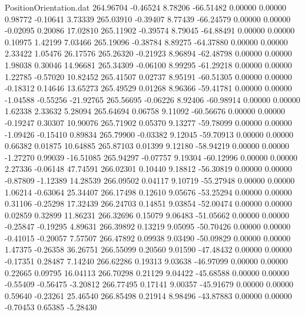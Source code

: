 \begin{filecontents}{PositionOrientation.dat}
 264.96704   -0.46524    8.78206   -66.51482    0.00000    0.00000    0.98772   -0.10641    3.73339
 265.03910   -0.39407    8.77439   -66.24579    0.00000    0.00000   -0.02095    0.20086   17.02810
 265.11902   -0.39574    8.79045   -64.88491    0.00000    0.00000    0.10975    1.42199    7.03466
 265.19096   -0.38784    8.89275   -64.37880    0.00000    0.00000    2.33422    1.05476   26.17576
 265.26320   -0.21923    8.96894   -62.48798    0.00000    0.00000    1.98038    0.30046   14.96681
 265.34309   -0.06100    8.99295   -61.29218    0.00000    0.00000    1.22785   -0.57020   10.82452
 265.41507    0.02737    8.95191   -60.51305    0.00000    0.00000   -0.18312    0.14646   13.65273
 265.49529    0.01268    8.96366   -59.41781    0.00000    0.00000   -1.04588   -0.55256  -21.92765
 265.56695   -0.06226    8.92406   -60.98914    0.00000    0.00000    1.62338    2.33632    5.28094
 265.64694    0.06758    9.11092   -60.56676    0.00000    0.00000   -0.19247    0.30307   10.90076
 265.71902    0.05370    9.13277   -59.78099    0.00000    0.00000   -1.09426   -0.15410    0.89834
 265.79900   -0.03382    9.12045   -59.70913    0.00000    0.00000    0.66382    0.01875   10.64885
 265.87103    0.01399    9.12180   -58.94219    0.00000    0.00000   -1.27270    0.99039  -16.51085
 265.94297   -0.07757    9.19304   -60.12996    0.00000    0.00000    2.27336   -0.06148   47.74591
 266.02301    0.10440    9.18812   -56.30819    0.00000    0.00000   -0.87809   -1.12389   14.28539
 266.09502    0.04117    9.10719   -55.27948    0.00000    0.00000    1.06214   -0.63064   25.34407
 266.17498    0.12610    9.05676   -53.25294    0.00000    0.00000    0.31106   -0.25298   17.32439
 266.24703    0.14851    9.03854   -52.00474    0.00000    0.00000    0.02859    0.32899   11.86231
 266.32696    0.15079    9.06483   -51.05662    0.00000    0.00000   -0.25847   -0.19295    4.89631
 266.39892    0.13219    9.05095   -50.70426    0.00000    0.00000   -0.41015   -0.20057    7.57507
 266.47892    0.09938    9.03490   -50.09829    0.00000    0.00000    1.47375   -0.26358   36.26751
 266.55099    0.20560    9.01590   -47.48432    0.00000    0.00000   -0.17351    0.28487    7.14240
 266.62286    0.19313    9.03638   -46.97099    0.00000    0.00000    0.22665    0.09795   16.04113
 266.70298    0.21129    9.04422   -45.68588    0.00000    0.00000   -0.55409   -0.56475   -3.20812
 266.77495    0.17141    9.00357   -45.91679    0.00000    0.00000    0.59640   -0.23261   25.46540
 266.85498    0.21914    8.98496   -43.87883    0.00000    0.00000   -0.70453    0.65385   -5.28430

\end{filecontents}
